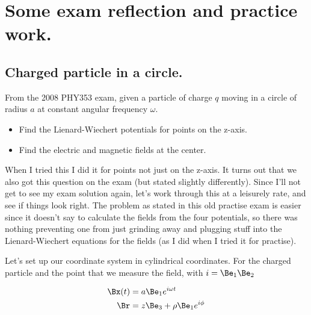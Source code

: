 
%

\chapter{Some exam reflection and practice work.}
\label{chap:relativisticElectrodynamicsExamReflection}
{}
\date{April 13, 2011}

\beginArtWithToc

\section{Charged particle in a circle.}

From the 2008 PHY353 exam, given a particle of charge $q$ moving in a circle of radius $a$ at constant angular frequency $\omega$.

\begin{itemize}
\item Find the Lienard-Wiechert potentials for points on the z-axis.
\item Find the electric and magnetic fields at the center.
\end{itemize}

When I tried this I did it for points not just on the z-axis.  It turns out that we also got this question on the exam (but stated slightly differently).  Since I'll not get to see my exam solution again, let's work through this at a leisurely rate, and see if things look right.  The problem as stated in this old practise exam is easier since it doesn't say to calculate the fields from the four potentials, so there was nothing preventing one from just grinding away and plugging stuff into the Lienard-Wiechert equations for the fields (as I did when I tried it for practise).

Let's set up our coordinate system in cylindrical coordinates.  For the charged particle and the point that we measure the field, with $i = \Be_1 \Be_2$

\begin{align}\label{eqn:relativisticElectrodynamicsExamReflection:n}
\Bx(t) &= a \Be_1 e^{i \omega t} \\
\Br &= z \Be_3 + \rho \Be_1 e^{i \phi}
\end{align}

